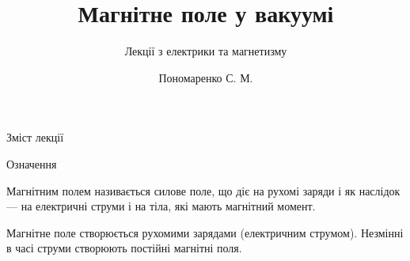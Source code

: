 \documentclass{beamer}
\title[Лекції електрики та магнетизму]{\huge\bfseries Магнітне поле у вакуумі}
\subtitle{Лекції з електрики та магнетизму}
\author{Пономаренко С. М.}
\date{}
\begin{document}
\begin{frame}[plain]
	\maketitle
\end{frame}

\begin{frame}{Зміст лекції}{}
	\tableofcontents
\end{frame}

\begin{frame}{Означення}{}
	\begin{block}{}\justifying
		\alert{Магнітним полем} називається силове поле, що \alert{діє на рухомі заряди} і як наслідок --- на електричні струми  і на тіла, які мають
		магнітний  момент.

		\bigskip

		Магнітне поле створюється рухомими зарядами (електричним струмом). Незмінні в часі струми створюють постійні магнітні поля.
	\end{block}
\end{frame}
\end{document}
